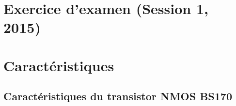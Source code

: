 \documentclass{../template/tp}
\begin{document}
\section{Exercice d'examen (Session 1, 2015)}

\appendix
\vspace*{-3cm}
\section{Caractéristiques}
\subsection{Caractéristiques du transistor NMOS BS170}
\label{anx:mos_doc}
\end{document}
